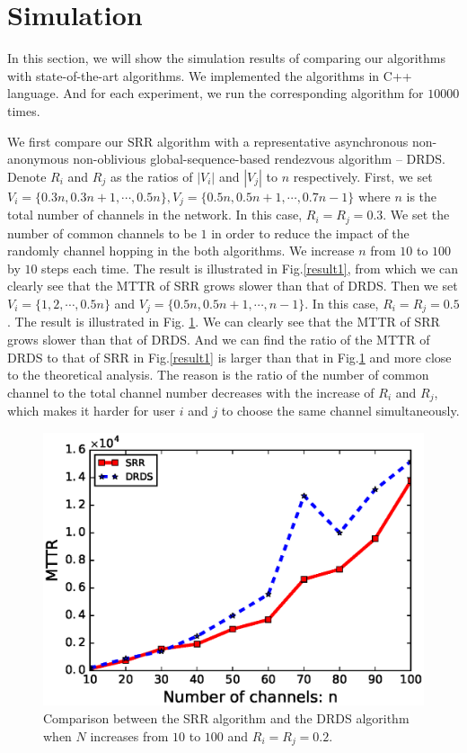\documentclass[10pt, conference, letterpaper]{IEEEtran}
\begin{document}
\section{Simulation}

In this section, we will show the simulation results of comparing  our algorithms  with state-of-the-art algorithms. We implemented the algorithms in C++ language. And for each experiment, we run the corresponding algorithm for $10000$ times.

 We first compare our SRR algorithm with a representative asynchronous non-anonymous non-oblivious global-sequence-based rendezvous algorithm -- DRDS. Denote $R_i$ and $R_j$ as the ratios of $|V_i|$ and $|V_j|$ to $n$ respectively. First, we set $V_i = \{0.3n, 0.3n +1,\cdots, 0.5n\}, V_j =\{0.5n, 0.5n + 1,\cdots, 0.7n -1 \}$ where $n$ is the total number of channels in the network. In this case, $R_i = R_j = 0.3$. We set the number of common channels to be $1$ in order to reduce the impact of the randomly channel hopping in the both algorithms. We increase $n$ from $10$ to $100$ by $10$ steps each time. The result is illustrated in Fig.\ref{result1}, from which we can clearly see that the MTTR of SRR grows slower than that of DRDS.  Then we set $V_i = \{1,2,\cdots, 0.5n\}$ and $V_j = \{0.5n, 0.5n + 1, \cdots, n -1 \}$. In this case, $R_i = R_j = 0.5$. The result is illustrated in Fig. \ref{result2}. We can clearly see that the MTTR of SRR grows slower than that of DRDS. And we can find the ratio of the MTTR of DRDS to that of SRR in Fig.\ref{result1} is larger than that in Fig.\ref{result2} and more close to the theoretical analysis. The reason is the ratio of the number of common channel to the total channel number decreases with the increase of $R_i$ and $R_j$, which makes it harder for user $i$ and $j$ to choose the same channel simultaneously.

\begin{figure}[htbp]
\centering
\includegraphics[width=0.7\columnwidth]{fig2}
\caption{Comparison between the SRR algorithm and the DRDS algorithm when $N$ increases from $10$ to $100$ and $R_i = R_j = 0.2$.}
\label{result2}
\end{figure}
\end{document}
